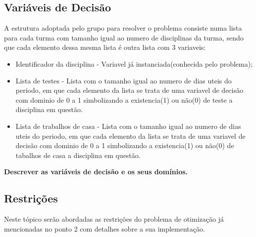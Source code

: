 \documentclass{llncs}
\begin{document}
\newpage
\subsection{Variáveis de Decisão}
A estrutura adoptada pelo grupo para resolver o problema consiste numa lista para cada turma com tamanho igual ao numero de disciplinas da turma, sendo que cada elemento dessa mesma lista é outra lista com 3 variaveis: 
\begin{itemize}
	\item Identificador da disciplina - Variavel já instanciada(conhecida pelo problema);
	\item Lista de testes - Lista com o tamanho igual ao numero de dias uteis do periodo, em que cada elemento da lista se trata de uma variavel de decisão com dominio de 0 a 1 simbolizando a existencia(1) ou não(0) de teste a disciplina em questão.
	\item Lista de trabalhos de casa - Lista com o tamanho igual ao numero de dias uteis do periodo, em que cada elemento da lista se trata de uma variavel de decisão com dominio de 0 a 1 simbolizando a existencia(1) ou não(0) de tabalhos de casa a disciplina em questão.
\end{itemize}

\textbf{
Descrever as variáveis de decisão e os seus domínios.}

\subsection{Restrições}
 Neste tópico serão abordadas as restrições do problema de otimização já mencionadas no ponto 2 com detalhes sobre a sua implementação. \\
 
\end{document}
